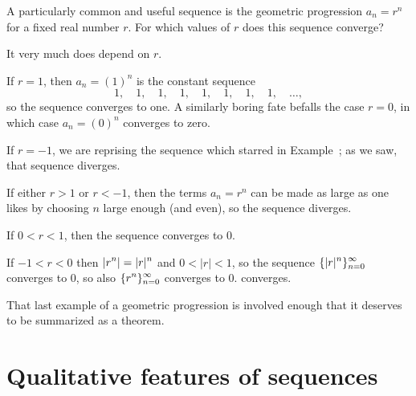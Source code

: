 \begin{example}
A particularly common and useful sequence is the geometric progression $a_n = r^n$
for a fixed real number $r$.  For which values of $r$ does this sequence converge?
\end{example}

\begin{solution}
It very much does depend on $r$.

If $r=1$, then $a_n = (1)^n$ is the constant sequence
$$
1,\quad
1,\quad
1,\quad
1,\quad
1,\quad
1,\quad
1,\quad
1,\quad \ldots,
$$
so the sequence converges to one.  A similarly boring fate befalls the
case $r = 0$, in which case $a_n = (0)^n$ converges to zero.

If $r=-1$, we are reprising the sequence which starred in
Example~; as we saw, that sequence
diverges.

If either $r>1$ or $r<-1$, then the terms $a_n = r^n$ can be made as
large as one likes by choosing $n$ large enough (and even), so the
sequence diverges.

If $0<r<1$, then the sequence converges to 0. 

If $-1<r<0$ then $\displaystyle |r^n|=|r|^n$ and $0<|r|<1$, so the sequence
$\displaystyle \{|r|^n\}_{n=0}^\infty$ converges to 0, so also 
$\displaystyle\{r^n\}_{n=0}^\infty$ converges to 0.
converges.
\end{solution}

That last example of a geometric progression is involved enough that
it deserves to be summarized as a theorem.


\section{Qualitative features of sequences}
\label{section:qualitative-features-of-sequences}


